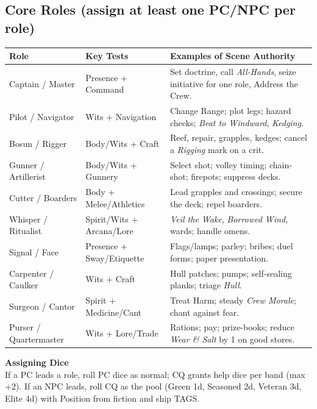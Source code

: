 \documentclass[11pt,oneside]{book}
\begin{document}
\subsection*{Core Roles (assign at least one PC/NPC per role)}
\begin{tabularx}{\linewidth}{@{}p{3.1cm} p{2.8cm} X@{}}
\toprule
\textbf{Role} & \textbf{Key Tests} & \textbf{Examples of Scene Authority}\\
\midrule
Captain / Master & Presence + Command & Set doctrine, call \emph{All-Hands}, seize initiative for one role, Address the Crew.\\
Pilot / Navigator & Wits + Navigation & Change Range; plot legs; hazard checks; \emph{Beat to Windward}, \emph{Kedging}.\\
Bosun / Rigger & Body/Wits + Craft & Reef, repair, grapples, kedges; cancel a \textit{Rigging} mark on a crit.\\
Gunner / Artillerist & Body/Wits + Gunnery & Select shot; volley timing; chain-shot; firepots; suppress decks.\\
Cutter / Boarders & Body + Melee/Athletics & Lead grapples and crossings; secure the deck; repel boarders.\\
Whisper / Ritualist & Spirit/Wits + Arcana/Lore & \emph{Veil the Wake}, \emph{Borrowed Wind}, wards; handle omens.\\
Signal / Face & Presence + Sway/Etiquette & Flags/lamps; parley; bribes; duel forms; paper presentation.\\
Carpenter / Caulker & Wits + Craft & Hull patches; pumps; self-sealing planks; triage \textit{Hull}.\\
Surgeon / Cantor & Spirit + Medicine/Cant & Treat Harm; steady \textit{Crew Morale}; chant against fear.\\
Purser / Quartermaster & Wits + Lore/Trade & Rations; pay; prize-books; reduce \textit{Wear \& Salt} by 1 on good stores.\\
\bottomrule
\end{tabularx}

\begin{tcolorbox}[breakable]
\textbf{Assigning Dice}\\
If a PC leads a role, roll PC dice as normal; CQ grants help dice per band (max +2). If an NPC leads, roll CQ as the pool (Green 1d, Seasoned 2d, Veteran 3d, Elite 4d) with Position from fiction and ship TAGS.
\end{tcolorbox}

\end{document}
